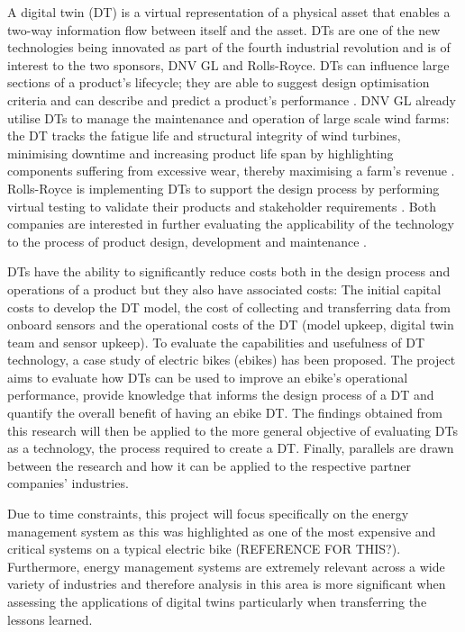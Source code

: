 \documentclass[a4paper, 10pt]{article}
\numberwithin{equation}{section}
\begin{document}
A digital twin (DT) is a virtual representation of a physical asset that enables a two-way information flow between itself and the asset. DTs are one of the new technologies being innovated as part of the fourth industrial revolution and is of interest to the two sponsors, DNV GL and Rolls-Royce. DTs can influence large sections of a product's lifecycle; they are able to suggest design optimisation criteria and can describe and predict a product's performance \cite{web:DTs}. DNV GL already utilise DTs to manage the maintenance and operation of large scale wind farms: the DT tracks the fatigue life and structural integrity of wind turbines, minimising downtime and increasing product life span by highlighting components suffering from excessive wear, thereby maximising a farm’s revenue \cite{ghobadi_2017}. Rolls-Royce is implementing DTs to support the design process by performing virtual testing to validate their products and stakeholder requirements \cite{RR_DT}. Both companies are interested in further evaluating the applicability of the technology to the process of product design, development and maintenance \cite{pres_DP4Kick-Off}.

DTs have the ability to significantly reduce costs both in the design process and operations of a product but they also have associated costs: The initial capital costs to develop the DT model, the cost of collecting and transferring data from onboard sensors and the operational costs of the DT (model upkeep, digital twin team and sensor upkeep). To evaluate the capabilities and usefulness of DT technology, a case study of electric bikes (ebikes) has been proposed. The project aims to evaluate how DTs can be used to improve an ebike’s operational performance, provide knowledge that informs the design process of a DT and quantify the overall benefit of having an ebike DT. The findings obtained from this research will then be applied to the more general objective of evaluating DTs as a technology, the process required to create a DT. Finally, parallels are drawn between the research and how it can be applied to the respective partner companies' industries. 

Due to time constraints, this project will focus specifically on the energy management system as this was highlighted as one of the most expensive and critical systems on a typical electric bike (REFERENCE FOR THIS?). Furthermore, energy management systems are extremely relevant across a wide variety of industries and therefore analysis in this area is more significant when assessing the applications of digital twins particularly when transferring the lessons learned.
\end{document}
